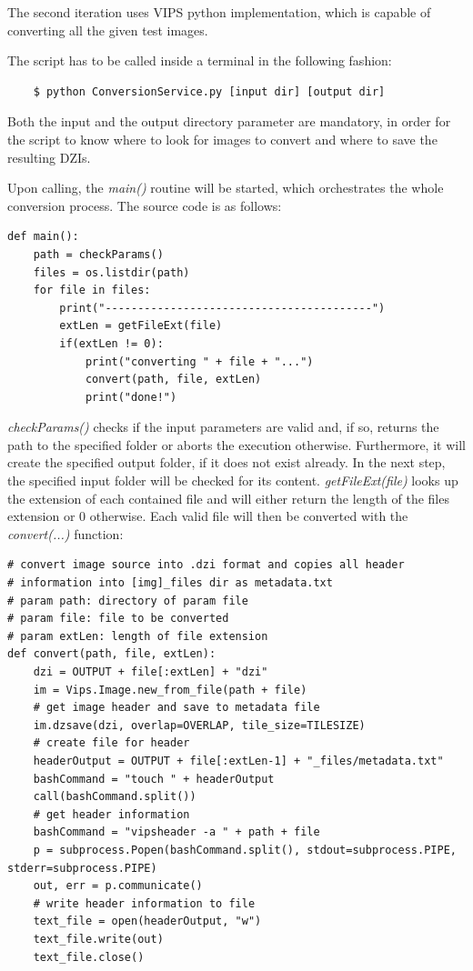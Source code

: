 The second iteration uses VIPS python implementation, which is capable of converting all the given test images.

The script has to be called inside a terminal in the following fashion:

\begin{lstlisting}
	$ python ConversionService.py [input dir] [output dir]
\end{lstlisting}

Both the input and the output directory parameter are mandatory, in order for the script to know where to look for images to convert and where to save the resulting DZIs.

Upon calling, the \emph{main()} routine will be started, which orchestrates the whole conversion process. The source code is as follows:

\begin{lstlisting}[frame=single]
def main():
	path = checkParams()
	files = os.listdir(path)
	for file in files:
		print("-----------------------------------------")
		extLen = getFileExt(file)
		if(extLen != 0):
			print("converting " + file + "...")
			convert(path, file, extLen)
			print("done!")
\end{lstlisting}

\emph{checkParams()} checks if the input parameters are valid and, if so, returns the path to the specified folder or aborts the execution otherwise. Furthermore, it will create the specified output folder, if it does not exist already. In the next step, the specified input folder will be checked for its content. \emph{getFileExt(file)} looks up the extension of each contained file and will either return the length of the files extension or $0$ otherwise. Each valid file will then be converted with the \emph{convert(...)} function:

\begin{lstlisting}[frame=single]
# convert image source into .dzi format and copies all header 
# information into [img]_files dir as metadata.txt
# param path: directory of param file
# param file: file to be converted
# param extLen: length of file extension
def convert(path, file, extLen):
	dzi = OUTPUT + file[:extLen] + "dzi"
	im = Vips.Image.new_from_file(path + file)
	# get image header and save to metadata file
	im.dzsave(dzi, overlap=OVERLAP, tile_size=TILESIZE)
	# create file for header
	headerOutput = OUTPUT + file[:extLen-1] + "_files/metadata.txt"
	bashCommand = "touch " + headerOutput
	call(bashCommand.split())
	# get header information
	bashCommand = "vipsheader -a " + path + file
	p = subprocess.Popen(bashCommand.split(), stdout=subprocess.PIPE, stderr=subprocess.PIPE)
	out, err = p.communicate()
	# write header information to file
	text_file = open(headerOutput, "w")
	text_file.write(out)
	text_file.close()
\end{lstlisting}

